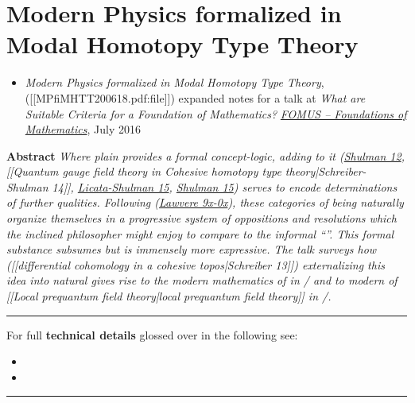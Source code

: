 


\section*{Modern Physics formalized in Modal Homotopy Type Theory}
\begin{itemize}%
\item {}
\emph{Modern Physics formalized in Modal Homotopy Type Theory},
 ([[MPfiMHTT200618.pdf:file]])
expanded notes for a talk at
\emph{What are Suitable Criteria for a Foundation of Mathematics?}
\emph{\href{http://fomus.weebly.com/}{FOMUS -- Foundations of Mathematics}}, July 2016
\end{itemize}
\textbf{Abstract} \emph{Where plain  provides a formal concept-logic, adding   to it (\href{modal+type+theory}{Shulman 12}, [[Quantum gauge field theory in Cohesive homotopy type theory|Schreiber-Shulman 14]], \hyperlink{LicataShulman}{Licata-Shulman 15}, \hyperlink{Shulman15}{Shulman 15}) serves to encode determinations of further qualities. Following (\href{cohesive+topos#References}{Lawvere 9x-0x}), these categories of being naturally organize themselves in a progressive system of oppositions and resolutions which the inclined philosopher might enjoy to compare to the informal ``''. This formal substance subsumes   but is immensely more expressive. The talk surveys how ([[differential cohomology in a cohesive topos|Schreiber 13]]) externalizing this idea into natural  gives rise to the modern mathematics of  in / and to modern  of [[Local prequantum field theory|local prequantum field theory]] in /.}

\vspace{.5em} \hrule \vspace{.5em}
For full \textbf{technical details} glossed over in the following see:
\begin{itemize}%
\item {}
\item {}
\end{itemize}
\vspace{.5em} \hrule \vspace{.5em}

